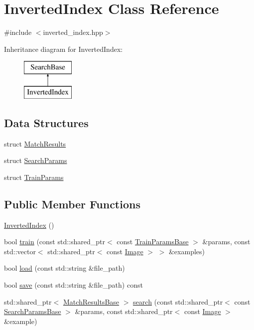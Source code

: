 \hypertarget{classInvertedIndex}{\section{Inverted\-Index Class Reference}
\label{classInvertedIndex}
}


{\ttfamily \#include $<$inverted\-\_\-index.\-hpp$>$}

Inheritance diagram for Inverted\-Index\-:\begin{figure}[H]
\begin{center}
\leavevmode
\includegraphics[height=2.000000cm]{classInvertedIndex}
\end{center}
\end{figure}
\subsection*{Data Structures}
\begin{DoxyCompactItemize}
\item 
struct \hyperlink{structInvertedIndex_1_1MatchResults}{Match\-Results}
\item 
struct \hyperlink{structInvertedIndex_1_1SearchParams}{Search\-Params}
\item 
struct \hyperlink{structInvertedIndex_1_1TrainParams}{Train\-Params}
\end{DoxyCompactItemize}
\subsection*{Public Member Functions}
\begin{DoxyCompactItemize}
\item 
\hyperlink{classInvertedIndex_a29cb6e37c9bf93ac94c2c6985c4224a8}{Inverted\-Index} ()
\item 
bool \hyperlink{classInvertedIndex_ae3f81ab03c477a2813c95334473c8e95}{train} (const std\-::shared\-\_\-ptr$<$ const \hyperlink{structTrainParamsBase}{Train\-Params\-Base} $>$ \&params, const std\-::vector$<$ std\-::shared\-\_\-ptr$<$ const \hyperlink{classImage}{Image} $>$ $>$ \&examples)
\item 
bool \hyperlink{classInvertedIndex_a815b5aaa4565500df3aa2eb92f865535}{load} (const std\-::string \&file\-\_\-path)
\item 
bool \hyperlink{classInvertedIndex_a3864d16c75319e4d38d03145ad3dcc5f}{save} (const std\-::string \&file\-\_\-path) const 
\item 
std\-::shared\-\_\-ptr$<$ \hyperlink{structMatchResultsBase}{Match\-Results\-Base} $>$ \hyperlink{classInvertedIndex_ae7f42b2552e9618c7fc0f5f36b365ca7}{search} (const std\-::shared\-\_\-ptr$<$ const \hyperlink{structSearchParamsBase}{Search\-Params\-Base} $>$ \&params, const std\-::shared\-\_\-ptr$<$ const \hyperlink{classImage}{Image} $>$ \&example)
\end{DoxyCompactItemize}


